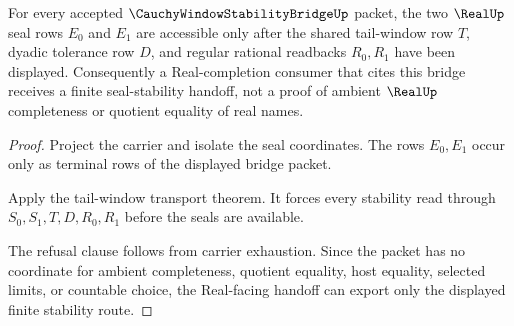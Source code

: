 \begin{theorem}
\label{thm:cauchy-window-stability-bridge-real-seal-handoff}
For every accepted $\CauchyWindowStabilityBridgeUp$ packet, the two $\RealUp$ seal rows $E_0$ and $E_1$ are accessible only after the shared tail-window row $T$, dyadic tolerance row $D$, and regular rational readbacks $R_0,R_1$ have been displayed. Consequently a Real-completion consumer that cites this bridge receives a finite seal-stability handoff, not a proof of ambient $\RealUp$ completeness or quotient equality of real names.
\end{theorem}
\begin{proof}
Project the carrier and isolate the seal coordinates. The rows $E_0,E_1$ occur only as terminal rows of the displayed bridge packet.

Apply the tail-window transport theorem. It forces every stability read through $S_0,S_1,T,D,R_0,R_1$ before the seals are available.

The refusal clause follows from carrier exhaustion. Since the packet has no coordinate for ambient completeness, quotient equality, host equality, selected limits, or countable choice, the Real-facing handoff can export only the displayed finite stability route.
\end{proof}

\begin{closurestatus}{\CauchyWindowStabilityBridgeUp}
  \theoryclosure{\seedClosure}
  \formalstatus{\unformalizedV}
\end{closurestatus}
